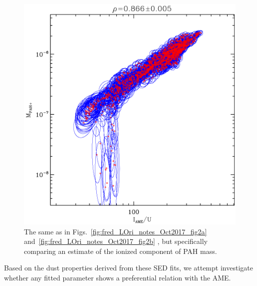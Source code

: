               \begin{figure}
                \includegraphics[width=\textwidth/2]{../Plots/ch_lori/fred_LOri_notes_Oct2017_fig2d.pdf}
                \centering
                \caption{ The same as in Figs.~\ref{fig:fred_LOri_notes_Oct2017_fig2a} and~\ref{fig:fred_LOri_notes_Oct2017_fig2b} , but specifically comparing an estimate of the ionized component of PAH mass. }
                \label{fig:fred_LOri_notes_Oct2017_fig2d}
              \end{figure}
    Based on the dust properties derived from these SED fits, we attempt investigate whether any fitted parameter shows a preferential relation with the AME.

